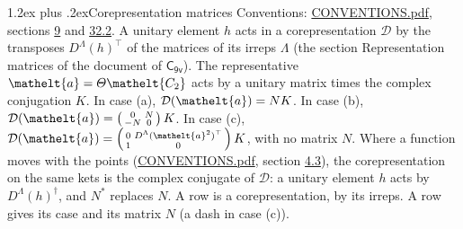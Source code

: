 \documentclass[10pt,a4paper]{article}
\makeatletter
\renewcommand\section{\@startsection{section}{1}{\z@}{-3ex plus -1ex minus -.2ex}%
  {1.2ex plus .2ex}{\normalfont\large\sffamily\bfseries\color{parttitle}}}
\numberwithin{equation}{section}
\newcommand{\eltfont}[1]{{\let\sigma\eltsigma\mathelt{#1}}}
\newcommand{\grp}[1]{\mathsf{#1}}
\newcommand{\elt}[1]{\eltfont{#1}}
\makeatother
\begin{document}
\section{Corepresentation matrices}\label{s:corep_matrices}
Conventions: \href{../../CONVENTIONS.pdf}{CONVENTIONS.pdf}, sections \href{../../../rotation/CONVENTIONS.pdf\#conv.9}{9} and \href{../../CONVENTIONS.pdf\#conv.32.2}{32.2}.
A unitary element $h$ acts in a corepresentation $\mathcal{D}$ by the transposes $D^{\Lambda}(h)^{\top}$ of the matrices of its irreps $\Lambda$ (the section Representation matrices of the document of \href{../../../rotation/data/pdf/C9v.pdf}{$\grp{C_{9v}}$}). The representative $\elt{a} = \varTheta\elt{C_{2}}$ acts by a unitary matrix times the complex conjugation $K$.
In case (a), $\mathcal{D}(\elt{a}) = NK$. In case (b), $\mathcal{D}(\elt{a}) = \left(\begin{smallmatrix} 0 & N \\ -N & 0 \end{smallmatrix}\right) K$. In case (c), $\mathcal{D}(\elt{a}) = \left(\begin{smallmatrix} 0 & D^{\Lambda}(\elt{a}^2)^{\top} \\ 1 & 0 \end{smallmatrix}\right) K$, with no matrix $N$.
Where a function moves with the points (\href{../../CONVENTIONS.pdf}{CONVENTIONS.pdf}, section \href{../../../rotation/CONVENTIONS.pdf\#conv.4.3}{4.3}), the corepresentation on the same kets is the complex conjugate of $\mathcal{D}$: a unitary element $h$ acts by $D^{\Lambda}(h)^{\dagger}$, and $N^{*}$ replaces $N$.
A row is a corepresentation, by its irreps. A row gives its case and its matrix $N$ (a dash in case (c)).
\end{document}
